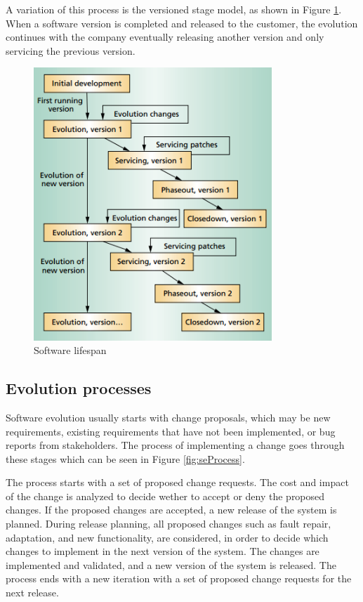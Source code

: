 A variation of this process is the versioned stage model, as shown in Figure \ref{fig:lifespan-2}. When a software version is completed and released to the customer, the evolution continues with the company eventually releasing another version and only servicing the previous version. 

\begin{figure}[ht!]
	\centering
	\includegraphics[width=0.8\textwidth]{images/lifespan-2.png}
	\caption{Software lifespan}
	\label{fig:lifespan-2}
\end{figure}

\subsection{Evolution processes}
Software evolution usually starts with change proposals, which may be new requirements, existing requirements that have not been implemented, or bug reports from stakeholders. The process of implementing a change goes through these stages\cite{Sommerville:2011:SE} which can be seen in Figure \ref{fig:seProcess}.

The process starts with a set of proposed change requests. The cost and impact of the change is analyzed to decide wether to accept or deny the proposed changes. If the proposed changes are accepted, a new release of the system is planned. During release planning, all proposed changes such as fault repair, adaptation, and new functionality, are considered, in order to decide which changes to implement in the next version of the system. The changes are implemented and validated, and a new version of the system is released. The process ends with a new iteration with a set of proposed change requests for the next release. 

